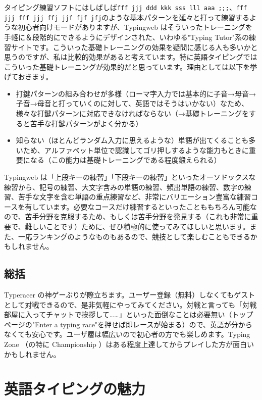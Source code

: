 タイピング練習ソフトにはしばしば\texttt{fff jjj ddd kkk sss lll aaa ;;;}、\texttt{fff jjj fff jjj ffj jjf fjf jfj}のような基本パターンを延々と打って練習するような初心者向けモードがありますが、Typingweb はそういったトレーニングを手軽に＆段階的にできるようにデザインされた、いわゆる"Typing Tutor"系の練習サイトです。こういった基礎トレーニングの効果を疑問に感じる人も多いかと思うのですが、私は比較的効果があると考えています。特に英語タイピングではこういった基礎トレーニングが効果的だと思っています。理由としては以下を挙げておきます。
\begin{itemize}
 \item 打鍵パターンの組み合わせが多様（ローマ字入力では基本的に子音→母音→子音→母音と打っていくのに対して、英語ではそうはいかない）なため、様々な打鍵パターンに対応できなければならない（→基礎トレーニングをすると苦手な打鍵パターンがよく分かる）
 \item 知らない（ほとんどランダム入力に思えるような）単語が出てくることも多いため、アルファベット単位で認識してゴリ押しするような能力もときに重要になる（この能力は基礎トレーニングである程度鍛えられる）
\end{itemize}

Typingweb は「上段キーの練習」「下段キーの練習」といったオーソドックスな練習から、記号の練習、大文字含みの単語の練習、頻出単語の練習、数字の練習、苦手な文字を含む単語の重点練習など、非常にバリエーション豊富な練習コースを有しています。必要なコースだけ練習するといったことももちろん可能なので、苦手分野を克服するため、もしくは苦手分野を発見する（これも非常に重要で、難しいことです）ために、ぜひ積極的に使ってみてほしいと思います。また、一応ランキングのようなものもあるので、競技として楽しむこともできるかもしれません。

\subsection{総括}

Typeracer の神ゲーぶりが際立ちます。ユーザー登録（無料）しなくてもゲストとして対戦できるので、是非気軽にやってみてください。対戦と言っても「対戦部屋に入ってチャットで挨拶して……」といった面倒なことは必要無い（トップページの"Enter a typing race"を押せば即レースが始まる）ので、英語が分からなくても安心です。ユーザ層は幅広いので初心者の方でも楽しめます。Typing Zone （の特に Championship ）はある程度上達してからプレイした方が面白いかもしれません。

\section{英語タイピングの魅力}

